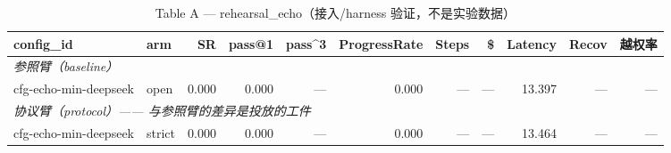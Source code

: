 \begin{table}[t]
\centering
\caption{Table A — rehearsal\_echo（接入/harness 验证，不是实验数据）}
\label{tab:a-rehearsal_echo}
\begin{tabular}{llrrrrrrrrr}
\toprule
config\_id & arm & SR & pass@1 & pass\^{}3 & ProgressRate & Steps & \$ & Latency & Recov & 越权率 \\
\midrule
\multicolumn{11}{l}{\textit{参照臂（baseline）}} \\
cfg-echo-min-deepseek & open & 0.000 & 0.000 & --- & 0.000 & --- & --- & 13.397 & --- & --- \\
\midrule
\multicolumn{11}{l}{\textit{协议臂（protocol）—— 与参照臂的差异是投放的工件}} \\
cfg-echo-min-deepseek & strict & 0.000 & 0.000 & --- & 0.000 & --- & --- & 13.464 & --- & --- \\
\bottomrule
\end{tabular}
\end{table}
